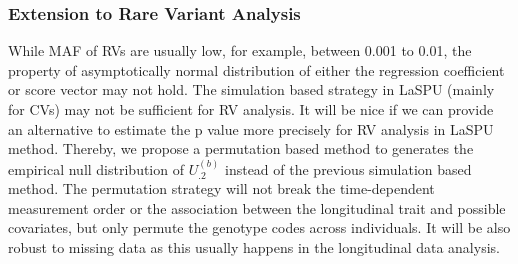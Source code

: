 \documentclass[12pt]{article}
\begin{document}
\subsubsection{Extension to Rare Variant Analysis}
While MAF of RVs are usually low, for example, between 0.001 to 0.01, the property of asymptotically normal distribution of either the regression coefficient or score vector may not hold. The simulation based strategy in LaSPU (mainly for CVs) may not be sufficient for RV analysis. It will be nice if we can provide an alternative to estimate the p value more precisely for RV analysis in LaSPU method. Thereby, we propose a permutation based method to generates the empirical null distribution of $U_{.2}^{ (b) }$ instead of the previous simulation based method. The permutation strategy will not break the time-dependent measurement order or the association between the longitudinal trait and possible covariates, but only permute the genotype codes across individuals. It will be also robust to missing data as this usually happens in the longitudinal data analysis. 
\end{document}
